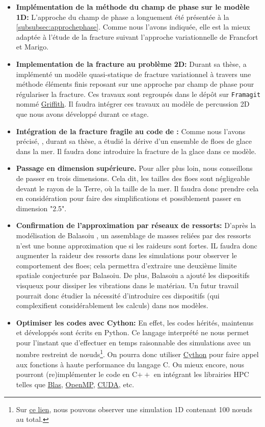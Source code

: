 \begin{itemize}
    \item \textbf{Implémentation de la méthode du champ de phase sur le modèle 1D:} L'approche du champ de phase a longuement été présentée à la \cref{subsubsec:approchephase}. Comme nous l'avons indiquée, elle est la mieux adaptée à l'étude de la fracture suivant l'approche variationnelle de Francfort et Marigo.
    \item \textbf{Implementation de la fracture au problème 2D:} Durant sa thèse, \citeauthor{balasoiu2020halthesis} a implémenté un modèle quasi-statique de fracture variationnel à travers une méthode éléments finis reposant sur une approche par champ de phase pour régulariser la fracture. Ces travaux sont regroupés dans le dépôt sur \texttt{Framagit} nommé \href{https://framagit.org/RaK/Griffith}{Griffith}. Il faudra intégrer ces travaux au modèle de percussion 2D que nous avons développé durant ce stage.
    \item \textbf{Intégration de la fracture fragile au code de \citeauthor{rabatel2015thesis}:} Comme nous l'avons précisé, \citeauthor{rabatel2015thesis}, durant sa thèse, a étudié la dérive d'un ensemble de floes de glace dans la mer. Il faudra donc introduire la fracture de la glace dans ce modèle.
    \item \textbf{Passage en dimension supérieure.} Pour aller plus loin, nous conseillons de passer en trois dimensions. Cela dit, les tailles des floes sont négligeable devant le rayon de la Terre, où la taille de la mer. Il faudra donc prendre cela en considération pour faire des simplifications et possiblement passer en dimension "2.5".
    \item \textbf{Confirmation de l'approximation par réseaux de ressorts:} D'après la modélisation de Balasoiu \parencite{balasoiu2020halthesis}, un assemblage de masses reliées par des ressorts n'est une bonne approximation que si les raideurs sont fortes. IL faudra donc augmenter la raideur des ressorts dans les simulations pour observer le comportement des floes; cela permettra d'extraire une deuxième limite spatiale conjecturée par Balasoiu. De plus, Balasoiu a ajouté les dispositifs visqueux pour dissiper les vibrations dans le matériau. Un futur travail pourrait donc étudier la nécessité d'introduire ces dispositifs (qui complexifient considérablement les calculs) dans nos modèles.  
    \item \textbf{Optimiser les codes avec Cython:} En effet, les codes hérités, maintenus et développés sont écrits en Python. Ce langage interprété ne nous permet pour l'instant que d'effectuer en temps raisonnable des simulations avec un nombre restreint de n\oe{}uds\footnote{Sur \href{https://seafile.unistra.fr/f/2c47bde2ca014e2bb02c/}{ce lien}, nous pouvons observer une simulation 1D contenant 100 n\oe{}uds au total.}. On pourra donc utiliser \href{https://cython.org/}{Cython} pour faire appel aux fonctions à haute performance du langage C. Ou mieux encore, nous pourront (re)implémenter le code en C$++$ en intégrant les librairies HPC telles que \href{http://www.netlib.org/blas/}{Blas}, \href{https://www.openmp.org/}{OpenMP}, \href{https://developer.nvidia.com/cuda-zone}{CUDA}, etc.

\end{itemize}
